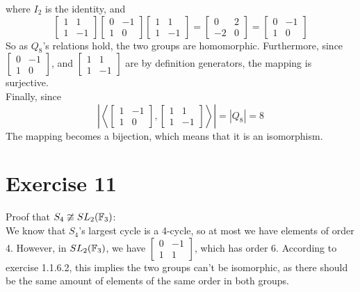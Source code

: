 \documentclass[12pt]{article}
\begin{document}
    where $I_2$ is the identity, and
    \[ \begin{bmatrix} 1 & 1 \\ 1 & -1 \end{bmatrix}
    \begin{bmatrix} 0 & -1 \\ 1 & 0 \end{bmatrix}
    \begin{bmatrix} 1 & 1 \\ 1 & -1 \end{bmatrix}
    = \begin{bmatrix} 0 & 2 \\ -2 & 0 \end{bmatrix}
    = \begin{bmatrix} 0 & -1 \\ 1 & 0 \end{bmatrix} \]
    So as $Q_8$'s relations hold,
    the two groups are homomorphic.
    Furthermore,
    since $\begin{bmatrix} 0 & -1 \\ 1 & 0 \end{bmatrix}$,
    and $\begin{bmatrix} 1 & 1 \\ 1 & -1 \end{bmatrix}$
    are by definition generators,
    the mapping is surjective. \\
    Finally, since
    \[ \left| \left\langle \begin{bmatrix} 1 & -1 \\ 1 & 0 \end{bmatrix},
    \begin{bmatrix} 1 & 1 \\ 1 & -1 \end{bmatrix} \right\rangle \right|
    = |Q_8| = 8 \]
    The mapping becomes a bijection,
    which means that it is an isomorphism.


    \section*{Exercise 11}
    Proof that $S_4 \ncong SL_2(\mathbb{F}_3)$: \\
    We know that $S_4$'s largest cycle is a 4-cycle,
    so at most we have elements of order 4.
    However, in $SL_2(\mathbb{F}_3)$,
    we have $ \begin{bmatrix} 0 & -1 \\ 1 & 1 \end{bmatrix}$,
    which has order 6.
    According to exercise 1.1.6.2,
    this implies the two groups can't be isomorphic,
    as there should be the same amount of elements of the same
    order in both groups.
\end{document}
